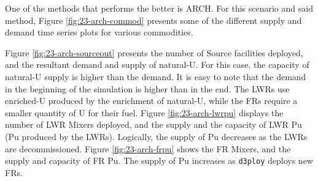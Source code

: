 \documentclass[11pt,letterpaper]{article}
\newcommand{\deploy}{\texttt{d3ploy}\xspace}%
\begin{document}
One of the methods that performs the better is ARCH. For this scenario and said method, Figure \ref{fig:23-arch-commod} presents some of the different supply and demand time series plots for various commodities.

Figure \ref{fig:23-arch-sourceout} presents the number of Source facilities deployed, and the resultant demand and supply of natural-U. For this case, the capacity of natural-U supply is higher than the demand. It is easy to note that the demand in the beginning of the simulation is higher than in the end. The LWRs use enriched-U produced by the enrichment of natural-U, while the FRs require a smaller quantity of U for their fuel. Figure \ref{fig:23-arch-lwrpu} displays the number of LWR Mixers deployed, and the supply and the capacity of LWR Pu (Pu produced by the LWRs). Logically, the supply of Pu decreases as the LWRs are decommissioned. Figure \ref{fig:23-arch-frpu} shows the FR Mixers, and the supply and capacity of FR Pu. The supply of Pu increases as \deploy deploys new FRs.
\end{document}
